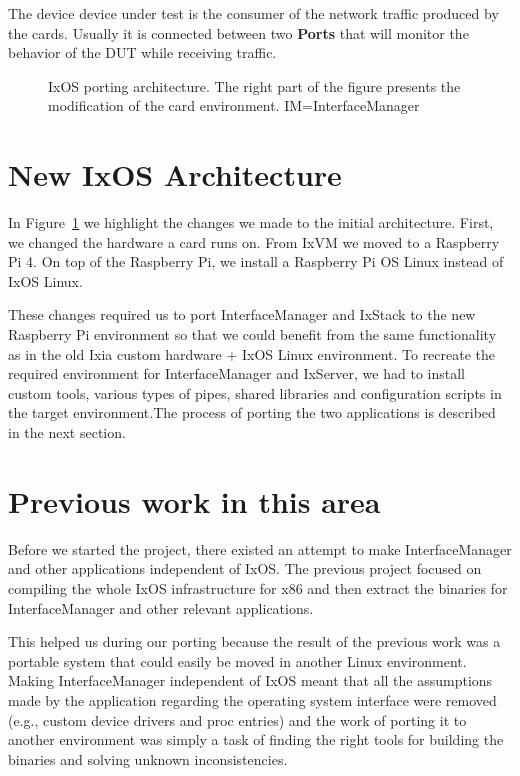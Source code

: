 The device device under test is the consumer of the network traffic produced by
the cards. Usually it is connected between two \textbf{Ports} that will monitor the
behavior of the DUT while receiving traffic.

\begin{figure}
    \centering
    \def\svgscale{0.95}
    
    \caption{IxOS porting architecture. The right part of the figure presents
    the modification of the card environment. \small{IM=InterfaceManager}}
    \label{fig:ixos_arch}
    \medskip
    \small
\end{figure}

\section{New IxOS Architecture}

In Figure~\ref{fig:ixos_arch} we highlight the changes we made to the initial
architecture. First, we changed the hardware a card runs on. From IxVM we moved
to a Raspberry Pi 4. On top of the Raspberry Pi, we install a Raspberry Pi OS Linux
instead of IxOS Linux.

These changes required us to port InterfaceManager and IxStack to the new
Raspberry Pi environment so that we could benefit from the same functionality as
in the old Ixia custom hardware + IxOS Linux environment. To recreate the
required environment for InterfaceManager and IxServer, we had to install custom tools,
various types of pipes, shared libraries and configuration scripts in the target
environment.The process of porting the two applications is described in the next
section.

\section{Previous work in this area}

Before we started the project, there existed an attempt to make InterfaceManager
and other applications independent of IxOS. The previous project focused on
compiling the whole IxOS infrastructure for x86 and then extract the binaries
for InterfaceManager and other relevant applications.

This helped us during our porting because the result of the previous work was a
portable system that could easily be moved in another Linux environment.
Making InterfaceManager independent of IxOS meant that all the assumptions made
by the application regarding the operating system interface were removed (e.g.,
custom device drivers and proc entries) and the work of porting it to another
environment was simply a task of finding the right tools for building the
binaries and solving unknown inconsistencies.

